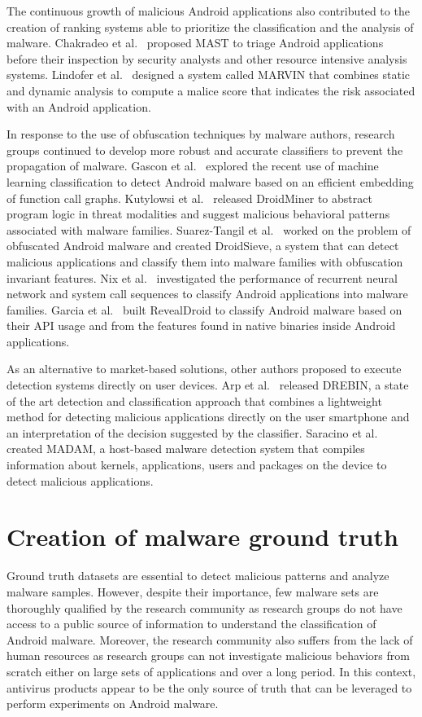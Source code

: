 The continuous growth of malicious Android applications also contributed to the creation of ranking systems able to prioritize the classification and the analysis of malware.
Chakradeo et al.~\cite{chakradeo_mast:_2013} proposed MAST to triage Android applications before their inspection by security analysts and other resource intensive analysis systems.
Lindofer et al.~\cite{lindorfer_marvin:_2015} designed a system called MARVIN that combines static and dynamic analysis to compute a malice score that indicates the risk associated with an Android application.

In response to the use of obfuscation techniques by malware authors, research groups continued to develop more robust and accurate classifiers to prevent the propagation of malware.
Gascon et al.~\cite{gascon_structural_2013} explored the recent use of machine learning classification to detect Android malware based on an efficient embedding of function call graphs.
Kutylowsi et al.~\cite{kutylowski_droidminer:_2014} released DroidMiner to abstract program logic in threat modalities and suggest malicious behavioral patterns associated with malware families.
Suarez-Tangil et al.~\cite{suarez-tangil_droidsieve:_2017} worked on the problem of obfuscated Android malware and created DroidSieve, a system that can detect malicious applications and classify them into malware families with obfuscation invariant features.
Nix et al.~\cite{nix_classification_2017} investigated the performance of recurrent neural network and system call sequences to classify Android applications into malware families.
Garcia et al.~\cite{garcia_lightweight_2018} built RevealDroid to classify Android malware based on their API usage and from the features found in native binaries inside Android applications.

As an alternative to market-based solutions, other authors proposed to execute detection systems directly on user devices.
Arp et al.~\cite{arp_drebin:_2014} released DREBIN, a state of the art detection and classification approach that combines a lightweight method for detecting malicious applications directly on the user smartphone and an interpretation of the decision suggested by the classifier.
Saracino et al.~\cite{saracino_madam:_2016} created MADAM, a host-based malware detection system that compiles information about kernels, applications, users and packages on the device to detect malicious applications.
\section{Creation of malware ground truth}
Ground truth datasets are essential to detect malicious patterns and analyze malware samples.
However, despite their importance, few malware sets are thoroughly qualified by the research community as research groups do not have access to a public source of information to understand the classification of Android malware.
Moreover, the research community also suffers from the lack of human resources as research groups can not investigate malicious behaviors from scratch either on large sets of applications and over a long period.
In this context, antivirus products appear to be the only source of truth that can be leveraged to perform experiments on Android malware.

